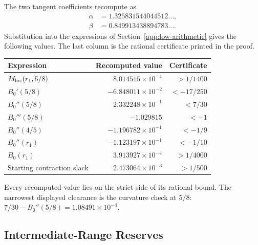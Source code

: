 The two tangent coefficients recompute as
\begin{align*}
 \alpha&=1.325831544044512\ldots,\\
 \beta&=0.849913438894783\ldots.
\end{align*}
Substitution into the expressions of Section~\ref{app:low-arithmetic}
gives the following values. The last column is the rational certificate
printed in the proof.
\begin{center}
{\small\setlength{\tabcolsep}{6pt}\renewcommand{\arraystretch}{1.08}
\begin{tabular}{@{}lrr@{}}
\toprule
Expression & Recomputed value & Certificate\\ \midrule
\(M_{\rm loc}(r_1,5/8)\) & \(8.014515\times10^{-4}\) & \(>1/1400\)\\
\(B_0'(5/8)\) & \(-6.848011\times10^{-2}\) & \(<-17/250\)\\
\(B_0''(5/8)\) & \(2.332248\times10^{-1}\) & \(<7/30\)\\
\(B_0'''(5/8)\) & \(-1.029815\) & \(<-1\)\\
\(B_0''(4/5)\) & \(-1.196782\times10^{-1}\) & \(<-1/9\)\\
\(B_0''(r_1)\) & \(-1.123197\times10^{-1}\) & \(<-1/10\)\\
\(B_0(r_1)\) & \(3.913927\times10^{-4}\) & \(>1/4000\)\\
Starting contraction slack & \(2.473064\times10^{-3}\) & \(>1/500\)\\
\bottomrule
\end{tabular}}
\end{center}
Every recomputed value lies on the strict side of its rational bound.
The narrowest displayed clearance is the curvature check at \(5/8\):
\(7/30-B_0''(5/8)=1.08491\times10^{-4}\).

\subsection{Intermediate-Range Reserves}

